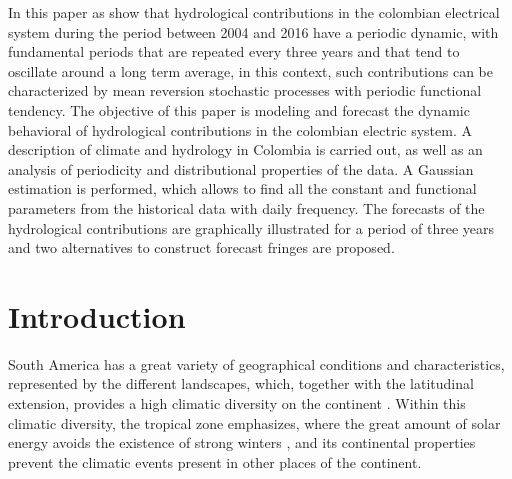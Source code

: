 \documentclass[12pt,halfline,a4paper]{ouparticle}
\begin{document}
	
\title{\textbf{}}
	
\author{%
	\address{Universidad EAFIT, Department of Finance\\
		Medellín, Colombia}
	\and
	\address{Universidad EAFIT, Department of Mathematical Sciences\\
		Medellín, Colombia}
	}
	

\abstract
	{In this paper as show that hydrological contributions in the colombian electrical system during the period between 2004 and 2016 have a periodic dynamic, with fundamental periods that are repeated every three years and that tend to oscillate around a long term average, in this context, such contributions can be characterized by mean reversion stochastic processes with periodic functional tendency. The objective of this paper is modeling and forecast the dynamic behavioral of hydrological contributions in the colombian electric system. A description of climate and hydrology in Colombia is carried out, as well as an analysis of periodicity and distributional properties of the data. A Gaussian estimation is performed, which allows to find all the constant and functional parameters from the historical data with daily frequency. The forecasts of the hydrological contributions are graphically illustrated for a period of three years and two alternatives to construct forecast fringes are proposed.} 
	
\date{}
	
	
\maketitle
	
	
\section{Introduction}

South America has a great variety of geographical conditions and characteristics, represented by the different landscapes, which, together with the latitudinal extension, provides a high climatic diversity on the continent \citep{Jiminez2005}. Within this climatic diversity, the tropical zone emphasizes, where the great amount of solar energy avoids the existence of strong winters \citep{Latrubesse2005}, and its continental properties prevent the climatic events present in other places of the continent.
\end{document}
